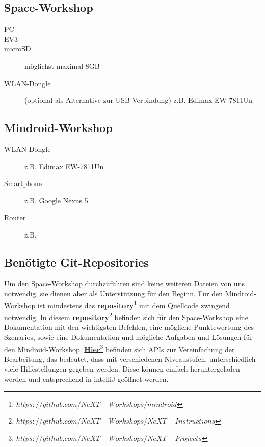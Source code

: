 \documentclass[
	ngerman,
	accentcolor=1c,%
	]{tudapub}
\begin{document}
\subsection{Space-Workshop}
\label{Space-Workshop}
\begin{description}
	\item[PC]
	\item[EV3]
	\item[microSD] m\"oglichst maximal 8GB
	\item[WLAN-Dongle] (optional als Alternative zur USB-Verbindung) z.B. Edimax EW-7811Un
\end{description}

\subsection{Mindroid-Workshop}
\label{Mindroid-Workshop}


\begin{description}
	\item[WLAN-Dongle] z.B. Edimax EW-7811Un
	\item[Smartphone] z.B. Google Nexus 5
	\item[Router] z.B. 
\end{description}

\subsection{Ben\"otigte Git-Repositories}
\label{git-repos}
Um den Space-Workshop durchzuf\"uhren sind keine weiteren Dateien von uns notwendig, sie dienen aber als Unterst\"utzung f\"ur den Beginn. F\"ur den Mindroid-Workshop ist mindestens das \href{https://github.com/NeXT-Workshops/mindroid}{\textbf{repository}\footnote{$https://github.com/NeXT-Workshops/mindroid$}} mit dem Quellcode zwingend notwendig.\newline
In diesem
\href{https://github.com/NeXT-Workshops/NeXT-Instructions}{\textbf{repository}\footnote{$https://github.com/NeXT-Workshops/NeXT-Instructions$}}
befinden sich für den Space-Workshop eine Dokumentation mit den wichtigsten Befehlen, eine m\"ogliche Punktewertung des Szenarios, sowie eine Dokumentation und m\"ogliche Aufgaben und L\"osungen f\"ur den Mindroid-Workshop.
\href{https://github.com/NeXT-Workshops/NeXT-Projects}{\textbf{Hier}\footnote{$https://github.com/NeXT-Workshops/NeXT-Projects$}}
befinden sich APIs zur Vereinfachung der Bearbeitung, das bedeutet, dass mit verschiedenen Niveaustufen, unterschiedlich viele Hilfestellungen gegeben werden. Diese k\"onnen einfach heruntergeladen werden und entsprechend in intelliJ ge\"offnet werden.
\end{document}
